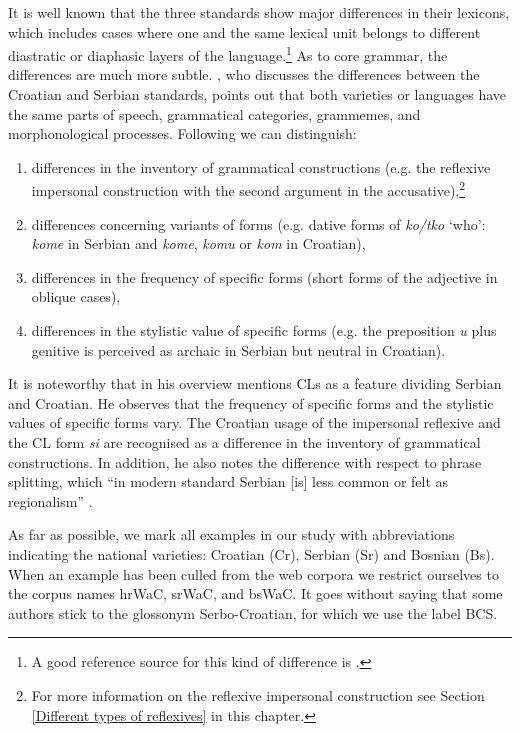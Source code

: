 It is well known that the three standards show major differences in their lexicons, which includes cases where one and the same lexical unit belongs to different diastratic or diaphasic layers of the language.\footnote{A good reference source for this kind of difference is \citet{Samardzija15}.}  As to core grammar, the differences are much more subtle. \citet[547]{Piper09}, who discusses the differences between the Croatian and Serbian standards, points out that both varieties or languages have the same parts of speech, grammatical categories, grammemes, and morphonological processes. Following \citet[542f]{Piper09} we can distinguish:
\begin{enumerate}
\item differences in the inventory of grammatical constructions (e.g. the reflexive impersonal construction with the second argument in the accusative),\footnote{For more information on the reflexive impersonal construction see Section \ref{Different types of reflexives} in this chapter.}
 \item differences concerning variants of forms (e.g. dative forms of \textit{ko/tko} `who': \textit{kome} in Serbian and \textit{kome}, \textit{komu} or \textit{kom} in Croatian), 
 \item differences in the frequency of specific forms (short forms of the adjective in oblique cases),
 \item differences in the stylistic value of specific forms (e.g. the preposition \textit{u} plus genitive is perceived as archaic in Serbian but neutral in Croatian).
\end{enumerate}

  It is noteworthy that in his overview \citet{Piper09} mentions CLs as a feature dividing Serbian and Croatian. He observes that the frequency of specific forms and the stylistic values of specific forms vary. The Croatian usage of the impersonal reflexive and the CL form \textit{si} are recognised as a difference in the inventory of grammatical constructions. In addition, he also notes the difference with respect to phrase splitting, which ``in modern standard Serbian [is] less common or felt as regionalism'' \citep[546]{Piper09}. 

As far as possible, we mark all examples in our study with abbreviations indicating the national varieties: Croatian (Cr), Serbian (Sr) and Bosnian (Bs). When an example has been culled from the web corpora we restrict ourselves to the corpus names hrWaC, srWaC, and bsWaC. It goes without saying that some authors stick to the glossonym Serbo-Croatian, for which we use the label BCS.

